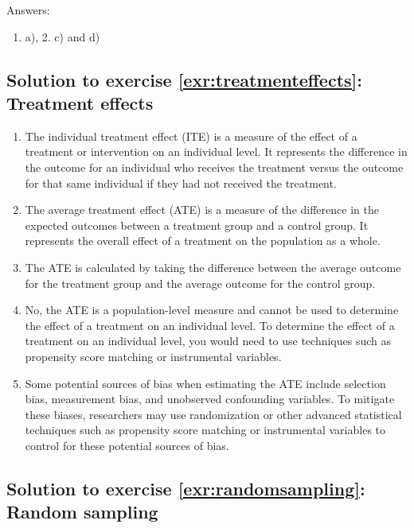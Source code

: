 \documentclass[
  12pt,
  oneside]{book}
\providecommand{\tightlist}{%
  \setlength{\itemsep}{0pt}\setlength{\parskip}{0pt}}
\theoremstyle{definition}
\theoremstyle{definition}
\theoremstyle{definition}
\theoremstyle{definition}
\theoremstyle{remark}
\begin{document}
Answers:

\begin{enumerate}
\def\labelenumi{\arabic{enumi}.}
\tightlist
\item
  a), 2. c) and d)
\end{enumerate}

\hypertarget{sol:treatmenteffects}{%
\subsection*{Solution to exercise \ref{exr:treatmenteffects}: Treatment effects}\label{sol:treatmenteffects}}

\begin{enumerate}
\def\labelenumi{\arabic{enumi}.}
\tightlist
\item
  The individual treatment effect (ITE) is a measure of the effect of a treatment or intervention on an individual level. It represents the difference in the outcome for an individual who receives the treatment versus the outcome for that same individual if they had not received the treatment.
\item
  The average treatment effect (ATE) is a measure of the difference in the expected outcomes between a treatment group and a control group. It represents the overall effect of a treatment on the population as a whole.
\item
  The ATE is calculated by taking the difference between the average outcome for the treatment group and the average outcome for the control group.
\item
  No, the ATE is a population-level measure and cannot be used to determine the effect of a treatment on an individual level. To determine the effect of a treatment on an individual level, you would need to use techniques such as propensity score matching or instrumental variables.
\item
  Some potential sources of bias when estimating the ATE include selection bias, measurement bias, and unobserved confounding variables. To mitigate these biases, researchers may use randomization or other advanced statistical techniques such as propensity score matching or instrumental variables to control for these potential sources of bias.
\end{enumerate}

\hypertarget{sol:randomsampling}{%
\subsection*{Solution to exercise \ref{exr:randomsampling}: Random sampling}\label{sol:randomsampling}}
\end{document}
